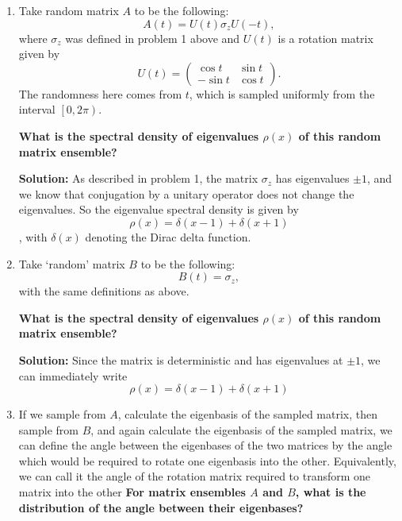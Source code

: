 \documentclass[a4paper]{article}
\begin{document}
\begin{enumerate}[label=(\alph*)]

\item Take random matrix $A$ to be the following:
\begin{equation}
    A(t) = U(t) \sigma_z U(-t),
\end{equation}
where $\sigma_z$ was defined in problem 1 above and $U(t)$ is a rotation matrix given by 
\begin{equation}
        U(t) = \left( \begin{array}{cc} \cos{t} & \sin{t} \\ -\sin{t} & \cos{t} \end{array} \right).
\end{equation}
The randomness here comes from $t$, which is sampled uniformly from the interval $\left[0, 2\pi\right)$.

\textbf{What is the spectral density of eigenvalues $\rho(x)$ of this random matrix ensemble?}

\begin{tcolorbox}
\textbf{Solution:}
As described in problem 1, the matrix $\sigma_z$ has eigenvalues $\pm 1$, and we know that conjugation by a unitary operator does not change the eigenvalues.  So the eigenvalue spectral density is given by 
$$\rho(x) = \delta(x - 1) + \delta(x + 1)$$,
with $\delta(x)$ denoting the Dirac delta function.
\end{tcolorbox}

\item Take `random' matrix $B$ to be the following: \begin{equation}
    B(t) = \sigma_z,
\end{equation}
with the same definitions as above.  

\textbf{What is the spectral density of eigenvalues $\rho(x)$ of this random matrix ensemble?}

\begin{tcolorbox}
\textbf{Solution:}
Since the matrix is deterministic and has eigenvalues at $\pm 1$, we can immediately write 
$$\rho(x) = \delta(x - 1) + \delta(x + 1)$$
\end{tcolorbox}

\item If we sample from $A$, calculate the eigenbasis of the sampled matrix, then sample from $B$, and again calculate the eigenbasis of the sampled matrix, we can define the angle between the eigenbases of the two matrices by the angle which would be required to rotate one eigenbasis into the other. Equivalently, we can call it the angle of the rotation matrix required to transform one matrix into the other \textbf{For matrix ensembles $A$ and $B$, what is the distribution of the angle between their eigenbases?}


\end{enumerate}
\end{document}
